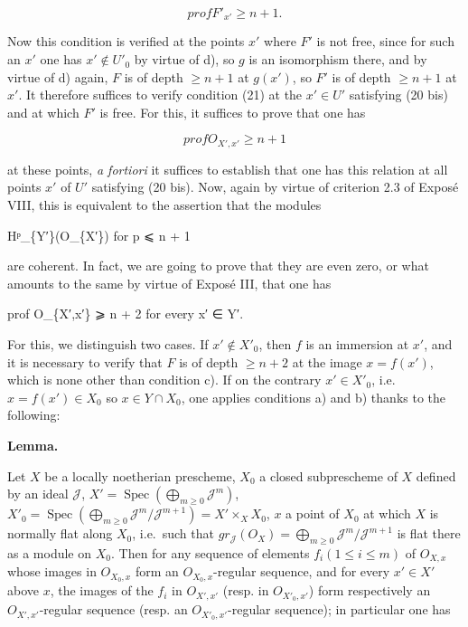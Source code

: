 \documentclass[
]{article}
\newenvironment{Shaded}{}{}
\newcommand{\NormalTok}[1]{#1}
\begin{document}
\[
prof F'_{x'} \geqslant n + 1.
\]

Now this condition is verified at the points \(x'\) where \(F'\) is not
free, since for such an \(x'\) one has \(x' \notin U'_{0}\) by virtue of
d), so \(g\) is an isomorphism there, and by virtue of d) again, \(F\)
is of depth \(\geqslant n + 1\) at \(g(x')\), so \(F'\) is of depth
\(\geqslant n + 1\) at \(x'\). It therefore suffices to verify condition
(21) at the \(x' \in U'\) satisfying (20 bis) and at which \(F'\) is
free. For this, it suffices to prove that one has

\[
prof O_{X',x'} \geqslant n + 1
\]

at these points, \emph{a fortiori} it suffices to establish that one has
this relation at all points \(x'\) of \(U'\) satisfying (20 bis). Now,
again by virtue of criterion 2.3 of Exposé VIII, this is equivalent to
the assertion that the modules

\begin{Shaded}
\begin{Highlighting}[]
\NormalTok{Hᵖ\_\{Y′\}(O\_\{X′\}) for p ⩽ n + 1}
\end{Highlighting}
\end{Shaded}

are coherent. In fact, we are going to prove that they are even zero, or
what amounts to the same by virtue of Exposé III, that one has

\begin{Shaded}
\begin{Highlighting}[]
\NormalTok{prof O\_\{X′,x′\} ⩾ n + 2 for every x′ ∈ Y′.}
\end{Highlighting}
\end{Shaded}

For this, we distinguish two cases. If \(x' \notin X'_{0}\), then \(f\)
is an immersion at \(x'\), and it is necessary to verify that \(F\) is
of depth \(\geqslant n + 2\) at the image \(x = f(x')\), which is none
other than condition c). If on the contrary \(x' \in X'_{0}\),
i.e.~\(x = f(x') \in X_{0}\) so \(x \in Y \cap X_{0}\), one applies
conditions a) and b) thanks to the following:

\textbf{Lemma.}

Let \(X\) be a locally noetherian prescheme, \(X_{0}\) a closed
subprescheme of \(X\) defined by an ideal \(\mathcal{J}\),
\(X' = \operatorname{Spec}(\bigoplus_{m\geqslant 0} \mathcal{J}^{m})\),
\(X'_{0} = \operatorname{Spec}(\bigoplus_{m\geqslant 0} \mathcal{J}^{m}/\mathcal{J}^{m+1}) = X' \times_{X} X_{0}\),
\(x\) a point of \(X_{0}\) at which \(X\) is normally flat along
\(X_{0}\), i.e.~such that
\(gr_{\mathcal{J}}(O_{X}) = \bigoplus_{m\geqslant 0} \mathcal{J}^{m}/\mathcal{J}^{m+1}\)
is flat there as a module on \(X_{0}\). Then for any sequence of
elements \(f_{i} (1 \leqslant i \leqslant m)\) of \(O_{X,x}\) whose
images in \(O_{X_{0},x}\) form an \(O_{X_{0},x}\)-regular sequence, and
for every \(x' \in X'\) above \(x\), the images of the \(f_{i}\) in
\(O_{X',x'}\) (resp. in \(O_{X'_{0},x'}\)) form respectively an
\(O_{X',x'}\)-regular sequence (resp. an \(O_{X'_{0},x'}\)-regular
sequence); in particular one has
\end{document}
